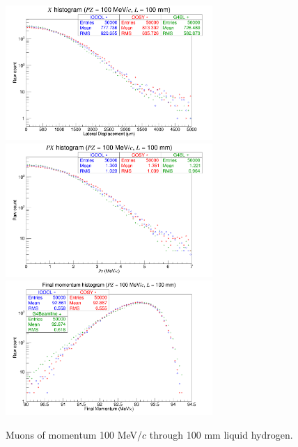 \begin{figure}[H]
  \centering
    \includegraphics[width=0.7\textwidth]{Benchmarking/LH/X.100.100.png} 
    \includegraphics[width=0.7\textwidth]{Benchmarking/LH/PX.100.100.png} 
    \includegraphics[width=0.7\textwidth]{Benchmarking/LH/strag.100.100.png} 
  \caption{Muons of momentum 100 MeV/$c$ through 100 mm liquid hydrogen.}
  \label{fig:100.100}
\end{figure}

